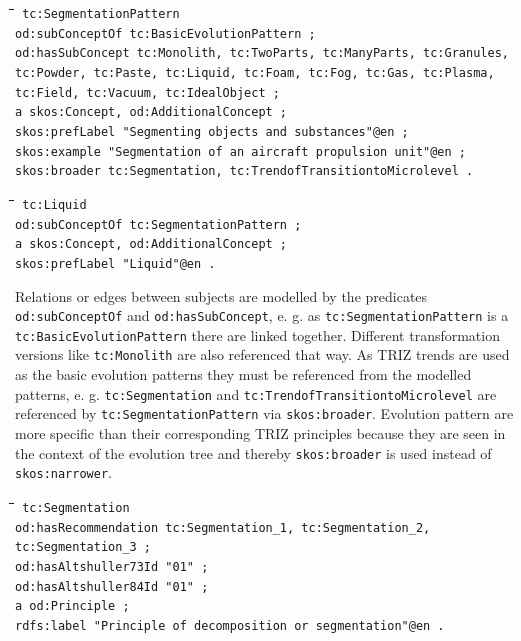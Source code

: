 \documentclass[11pt,a4paper]{article}
\newenvironment{code}{\tt \begin{tabbing}
\hskip12pt\=\hskip12pt\=\hskip12pt\=\hskip12pt\=\hskip5cm\=\hskip5cm\=\kill}
{\end{tabbing}}
\begin{document}
\begin{code}\tt
tc:SegmentationPattern \\
\> od:subConceptOf tc:BasicEvolutionPattern ; \\
\> od:hasSubConcept tc:Monolith, tc:TwoParts, tc:ManyParts, tc:Granules, \\
\> tc:Powder, tc:Paste, tc:Liquid, tc:Foam, tc:Fog, tc:Gas, tc:Plasma, \\
\> tc:Field, tc:Vacuum, tc:IdealObject ; \\
\> a skos:Concept, od:AdditionalConcept ; \\
\> skos:prefLabel "Segmenting objects and substances"@en ; \\
\> skos:example "Segmentation of an aircraft propulsion unit"@en ; \\
\> skos:broader tc:Segmentation, tc:TrendofTransitiontoMicrolevel .
\end{code}
\begin{code}\tt
tc:Liquid \\
\> od:subConceptOf tc:SegmentationPattern ; \\
\> a skos:Concept, od:AdditionalConcept ; \\
\> skos:prefLabel "Liquid"@en . \\
\end{code}

Relations or edges between subjects are modelled by the predicates \texttt{od:subConceptOf} and \texttt{od:hasSubConcept}, e. g. as \texttt{tc:SegmentationPattern} is a \texttt{tc:BasicEvolutionPattern} there are linked together. Different transformation versions like \texttt{tc:Monolith} are also referenced that way. As TRIZ trends are used as the basic evolution patterns they must be referenced from the modelled patterns, e. g. \texttt{tc:Segmentation} and \texttt{tc:TrendofTransitiontoMicrolevel} are referenced by \texttt{tc:SegmentationPattern} via \texttt{skos:broader}. Evolution pattern are more specific than their corresponding TRIZ principles because they are seen in the context of the evolution tree and thereby \texttt{skos:broader} is used instead of \texttt{skos:narrower}. 

\begin{code}\tt
tc:Segmentation \\
\> od:hasRecommendation tc:Segmentation\_1, tc:Segmentation\_2, tc:Segmentation\_3 ; \\
\> od:hasAltshuller73Id "01" ; \\
\> od:hasAltshuller84Id "01" ; \\
\> a od:Principle ; \\
\> rdfs:label "Principle of decomposition or segmentation"@en .
\end{code}
\end{document}
